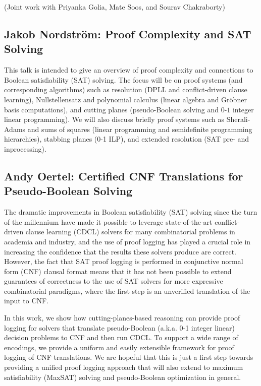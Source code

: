 \documentclass[11pt]{article}
\begin{document}
(Joint work with Priyanka Golia, Mate Soos, and Sourav Chakraborty)


\subsection*{Jakob Nordström:
  Proof Complexity and SAT Solving}\label{Nordstrom}

This talk is intended to give an overview of proof complexity and
connections to Boolean satisfiability (SAT) solving. The focus will be
on proof systems (and corresponding algorithms) such as resolution
(DPLL and conflict-driven clause learning), Nullstellensatz and
polynomial calculus (linear algebra and Gröbner basis computations),
and cutting planes (pseudo-Boolean solving and $0$-$1$ integer linear
programming). We will also discuss briefly proof systems such as
Sherali-Adams and sums of squares (linear programming and semidefinite
programming hierarchies), stabbing planes (0-1 ILP), and extended
resolution (SAT pre- and inprocessing).


\subsection*{Andy Oertel: Certified CNF Translations for Pseudo-Boolean Solving}\label{Oertel}

The dramatic improvements in Boolean satisfiability (SAT) solving since the turn of the millennium have made it possible to leverage state-of-the-art conflict-driven clause learning (CDCL) solvers for many combinatorial problems in academia and industry, and the use of proof logging has played a crucial role in increasing the confidence that the results these solvers produce are correct. However, the fact that SAT proof logging is performed in conjunctive normal form (CNF) clausal format means that it has not been possible to extend guarantees of correctness to the use of SAT solvers for more expressive combinatorial paradigms, where the first step is an unverified translation of the input to CNF.

In this work, we show how cutting-planes-based reasoning can provide proof logging for solvers that translate pseudo-Boolean (a.k.a. 0-1 integer linear) decision problems to CNF and then run CDCL. To support a wide range of encodings, we provide a uniform and easily extensible framework for proof logging of CNF translations. We are hopeful that this is just a first step towards providing a unified proof logging approach that will also extend to maximum satisfiability (MaxSAT) solving and pseudo-Boolean optimization in general.
\end{document}
